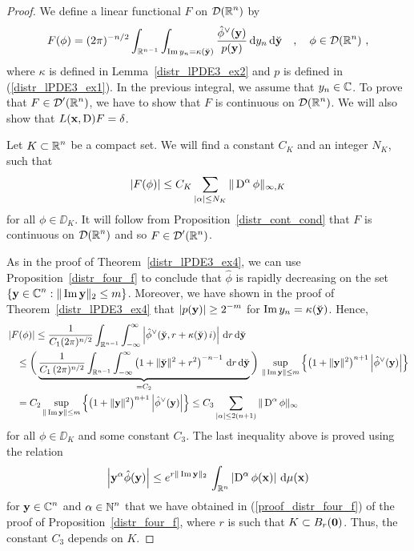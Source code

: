 \begin{proof}
We define a linear functional $F$ on $\displaystyle \mathcal{D}(\mathbb{R}^n)$ by
\[
F(\phi) = (2\pi)^{-n/2} \int_{\mathbb{R}^{n-1}} \int_{\operatorname{Im} y_n = \kappa(\breve{\mathbf{y}})}
\frac{\hat{\phi}^\vee(\mathbf{y})}{p(\mathbf{y})}\,\mathrm{d}{y_n}\,\mathrm{d}{\breve{\mathbf{y}}}
\quad , \quad \phi \in \mathcal{D}(\mathbb{R}^n) \ ,
\]
where $\kappa$ is defined in Lemma~\ref{distr_lPDE3_ex2} and $p$ is
defined in (\ref{distr_lPDE3_ex1}).  In the previous integral, we
assume that $y_n \in \mathbb{C}$.  To prove that
$\displaystyle F \in \mathcal{D}'(\mathbb{R}^n)$, we have
to show that $F$ is continuous on
$\displaystyle \mathcal{D}(\mathbb{R}^n)$.  We will also show
that $L(\mathbf{x},\operatorname{D})F = \delta$.

 Let $\displaystyle K \subset \mathbb{R}^n$ be a compact set.  We will find a
constant $C_K$ and an integer $N_K$, such that
\[
\left|F(\phi)\right| \leq C_K \sum_{|\alpha|\leq N_K} \|\operatorname{D}^\alpha
\phi\|_{\infty,K}
\]
for all $\phi \in \DD_K$.
It will follow from Proposition~\ref{distr_cont_cond} that $F$ is
continuous on $\displaystyle \mathcal{D}(\mathbb{R}^n)$ and so
$\displaystyle F\in \mathcal{D}'(\mathbb{R}^n)$.

As in the proof of Theorem~\ref{distr_lPDE3_ex4}, we can use
Proposition~\ref{distr_four_f} to conclude that $\hat{\phi}$ is
rapidly decreasing on the set
$\displaystyle \{\mathbf{y} \in \mathbb{C}^n : \|\operatorname{Im} \mathbf{y}\|_2 \leq m \}$.
Moreover, we have shown in the proof of Theorem~\ref{distr_lPDE3_ex4} that
$\displaystyle \left|p(\mathbf{y})\right| \geq 2^{-m}$ for
$\operatorname{Im} y_n = \kappa(\breve{\mathbf{y}})$.  Hence, 
\begin{align*}
&\left| F(\phi) \right|
\leq \frac{1}{C_1(2\pi)^{n/2}}
\int_{\mathbb{R}^{n-1}} \int_{-\infty}^\infty
\left| \hat{\phi}^\vee(\breve{\mathbf{y}},r + \kappa(\breve{\mathbf{y}})\,i) \right|
\,\mathrm{d}{r}\,\mathrm{d}{\breve{\mathbf{y}}} \\
&\quad\leq \bigg( \underbrace{ \frac{1}{C_1\,(2\pi)^{n/2}}
\int_{\mathbb{R}^{n-1}} \int_{-\infty}^\infty
\left( 1+\|\breve{\mathbf{y}}\|^2 + r^2\right)^{-n-1} \,\mathrm{d}{r}
  \,\mathrm{d}{\breve{\mathbf{y}}}}_{=C_2} \bigg)
\, \sup_{\|\operatorname{Im} \mathbf{y}\| \leq m } \left\{
\left( 1+ \|\mathbf{y}\|^2  \right)^{n+1}
\left| \hat{\phi}^\vee(\mathbf{y}) \right| \right\} \\
&\quad = C_2 \sup_{\|\operatorname{Im} \mathbf{y}\| \leq m} \left\{
\left( 1+\|\mathbf{y}\|^2 \right)^{n+1}
\left| \hat{\phi}^\vee(\mathbf{y}) \right| \right\}
\leq C_3 \sum_{|\alpha|\leq 2(n+1)} \|\operatorname{D}^\alpha \phi\|_\infty
\end{align*}
for all $\phi \in \DD_K$ and some constant $C_3$.
The last inequality above is proved using the relation
\[
\left| \mathbf{y}^\alpha \hat{\phi}(\mathbf{y}) \right|
\leq e^{r\|\operatorname{Im} \mathbf{y}\|_2}\,\int_{\mathbb{R}^n}
\left|\operatorname{D}^\alpha \phi(\mathbf{x})\right| \,\mathrm{d}{\mu(\mathbf{x})}
\]
for $\displaystyle \mathbf{y} \in \mathbb{C}^n$ and
$\displaystyle \alpha \in \mathbb{N}^n$ that we have obtained in
(\ref{proof_distr_four_f}) of the proof of Proposition~\ref{distr_four_f},
where $r$ is such that $K \subset B_r(\mathbf{0})$.
Thus, the constant $C_3$ depends on $K$.


\end{proof}
